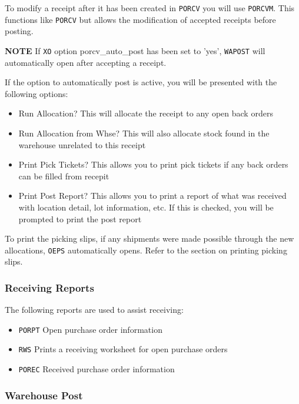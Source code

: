 To modify a receipt after it has been created in \texttt{PORCV} you will use \texttt{PORCVM}. This functions like \texttt{PORCV} but allows the modification of accepted receipts before posting.

\textbf{NOTE} If \texttt{XO} option porcv\_auto\_post has been set to 'yes', \texttt{WAPOST} will automatically open after accepting a receipt.

If the option to automatically post is active, you will be presented with the following options:

\begin{itemize}
	\item Run Allocation? \textemdash This will allocate the receipt to any open back orders
	\item Run Allocation from Whse? \textemdash This will also allocate stock found in the warehouse unrelated to this receipt
	\item Print Pick Tickets? \textemdash This allows you to print pick tickets if any back orders can be filled from recepit
	\item Print Post Report? \textemdash This allows you to print a report of what was received with location detail, lot information, etc. If this is checked, you will be prompted to print the post report
\end{itemize}

To print the picking slips, if any shipments were made possible through the new allocations, \texttt{OEPS} automatically opens. Refer to the section on printing picking slips.

\subsubsection{Receiving Reports}

The following reports are used to assist receiving:


\begin{itemize}
	\item \texttt{PORPT} \textemdash Open purchase order information
	\item \texttt{RWS} \textemdash Prints a receiving worksheet for open purchase orders
	\item \texttt{POREC} \textemdash Received purchase order information
\end{itemize}

\subsubsection{Warehouse Post}

